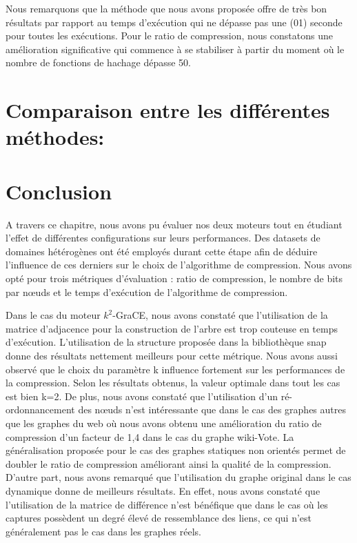 	Nous remarquons que la méthode que nous avons proposée offre de très bon résultats par rapport au temps d'exécution qui ne dépasse pas une (01) seconde pour toutes les exécutions. Pour le ratio de compression, nous constatons une amélioration significative qui commence à se stabiliser à partir du moment où le nombre de fonctions de hachage dépasse 50. 
	
	\section{Comparaison entre les différentes méthodes:}
	
	
	\section{Conclusion}
	
	A travers ce chapitre,  nous avons pu évaluer nos deux moteurs tout en étudiant l'effet de différentes configurations sur leurs performances. Des datasets de domaines hétérogènes ont été employés durant cette étape afin de déduire l'influence de ces derniers sur le choix de l'algorithme de compression. Nous avons opté pour trois métriques d'évaluation : ratio de compression, le nombre de bits par nœuds et le temps d'exécution de l'algorithme de compression.
	
	Dans le cas du moteur $k^2$-GraCE, nous avons constaté que l'utilisation de la matrice d'adjacence pour la construction de l'arbre est trop couteuse en temps d'exécution. L'utilisation de la structure proposée dans la bibliothèque \gls{snap} donne des résultats nettement meilleurs pour cette métrique. Nous avons aussi observé que le choix du paramètre k influence fortement sur les performances de la compression. Selon les résultats obtenus, la valeur optimale dans tout les cas est bien k=2. De plus, nous avons constaté que l'utilisation d'un ré-ordonnancement des nœuds n'est intéressante que dans le cas des graphes autres que les graphes du web où nous avons obtenu une amélioration du ratio de compression d'un facteur de 1,4 dans le cas du graphe wiki-Vote. La généralisation  proposée pour le cas des graphes statiques non orientés permet de doubler le ratio de compression améliorant ainsi la qualité de la compression. D'autre part, nous avons remarqué que l'utilisation du graphe original dans le cas dynamique donne de meilleurs résultats. En effet, nous avons constaté que l'utilisation de la matrice de différence n'est bénéfique que dans le cas où les captures possèdent un degré élevé de ressemblance des liens, ce qui n'est généralement pas le cas dans les graphes réels.
	
